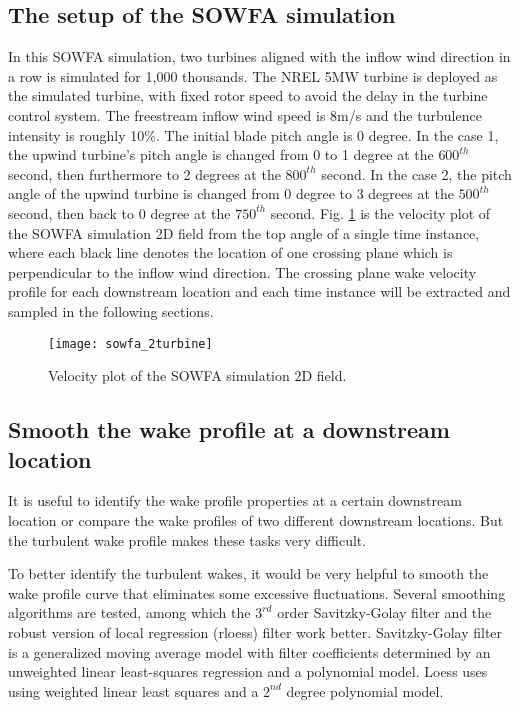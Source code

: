 \documentclass{umthesis}
\begin{document}
\subsection{The setup of the SOWFA simulation}
In this SOWFA simulation, two turbines aligned with the inflow wind direction in a row is simulated for 1,000 thousands. The NREL 5MW turbine is deployed as the simulated turbine, with fixed rotor speed to avoid the delay in the turbine control system. The freestream inflow wind speed is 8m/s and the turbulence intensity is roughly 10\%. The initial blade pitch angle is 0 degree. In the case 1, the upwind turbine's pitch angle is changed from 0 to 1 degree at the $600^{th}$ second, then furthermore to 2 degrees at the $800^{th}$ second. In the case 2, the pitch angle of the upwind turbine is changed from 0 degree to 3 degrees at the $500^{th}$ second, then back to 0 degree at the $750^{th}$ second. Fig. \ref{fig:sowfa_2turbine} is the velocity plot of the SOWFA simulation 2D field from the top angle of a single time instance, where each black line denotes the location of one crossing plane which is perpendicular to the inflow wind direction. The crossing plane wake velocity profile for each downstream location and each time instance will be extracted and sampled in the following sections.

\begin{figure}
  \centering
  \texttt{[image: sowfa\_2turbine]}
  \caption{Velocity plot of the SOWFA simulation 2D field.}\label{fig:sowfa_2turbine}
\end{figure}


\subsection{Smooth the wake profile at a downstream location}
It is useful to identify the wake profile properties at a certain downstream location or compare the wake profiles of two different downstream locations. But the turbulent wake profile makes these tasks very difficult.

To better identify the turbulent wakes, it would be very helpful to smooth the wake profile curve that eliminates some excessive fluctuations. Several smoothing algorithms are tested, among which the $3^{rd}$ order Savitzky-Golay filter \cite{Savitzky} and the robust version of local regression (rloess) filter \cite{Cleveland} work better. Savitzky-Golay filter is a generalized moving average model with filter coefficients determined by an unweighted linear least-squares regression and a polynomial model. Loess uses using weighted linear least squares and a $2^{nd}$ degree polynomial model. 
\end{document}
